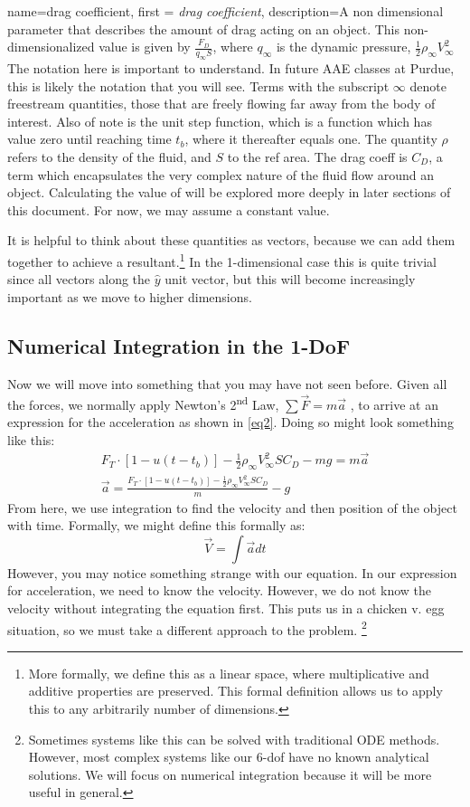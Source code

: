 \documentclass[12pt]{report}
\begin{document}
{
    name=drag coefficient,
    first = \textit{drag coefficient},
    description={A non dimensional parameter that describes the amount of drag acting on an object. This non-dimensionalized value is given by $\frac{F_D}{q_{\infty}S}$, where $q_{\infty}$ is the dynamic pressure, $\frac{1}{2}\rho_{\infty}V_{\infty}^2$}
    }
The notation here is important to understand. In future AAE classes at Purdue, this is likely the notation that you will see. Terms with the subscript $\infty$ denote \gls{freestream} quantities, those that are freely flowing far away from the body of interest. Also of note is the unit step function, which is a function which has value zero until reaching time $t_b$, where it thereafter equals one. The quantity  $\rho$ refers to the density of the fluid, and $S$ to the \gls{ref area}. The \gls{drag coeff} is $C_D$, a term which encapsulates the very complex nature of the fluid flow around an object. Calculating the value of  will be explored more deeply in later sections of this document. For now, we may assume a constant value.

It is helpful to think about these quantities as vectors, because we can add them together to achieve a resultant.\footnote{More formally, we define this as a linear space, where multiplicative and additive properties are preserved. This formal definition allows us to apply this to any arbitrarily number of dimensions. } In the 1-dimensional case this is quite trivial since all vectors along the $\hat{y}$ unit vector, but this will become increasingly important as we move to higher dimensions.
\subsection{Numerical Integration in the 1-DoF}\label{sec: Numerical Integration in the 1DoF}
Now we will move into something that you may have not seen before. Given all the forces, we normally apply Newton’s 2\textsuperscript{nd} Law, $\sum{\vec{F}}=m\vec{a}$ , to arrive at an expression for the acceleration as shown in \eqref{eq2}. Doing so might look something like this:
\begin{gather}
F_T \cdot [1-u(t-t_b)]-\frac{1}{2}\rho_{\infty}V_{\infty}^2SC_D-mg=m\vec{a}\label{eq1} \\
\vec{a}=\frac{F_T \cdot [1-u(t-t_b)]-\frac{1}{2}\rho_{\infty}V_{\infty}^2SC_D}{m}-g\label{eq2}
\end{gather}
 From here, we use integration to find the velocity and then position of the object with time. Formally, we might define this formally as:
 $$\vec{V}=\int{\vec{a}}{dt}$$
However, you may notice something strange with our equation. In our expression for acceleration, we need to know the velocity. However, we do not know the velocity without integrating the equation first. This puts us in a chicken v. egg situation, so we must take a different approach to the problem. \footnote{Sometimes systems like this can be solved with traditional ODE methods. However, most complex systems like our 6-\gls{dof} have no known analytical solutions. We will focus on numerical integration because it will be more useful in general. }
\end{document}

